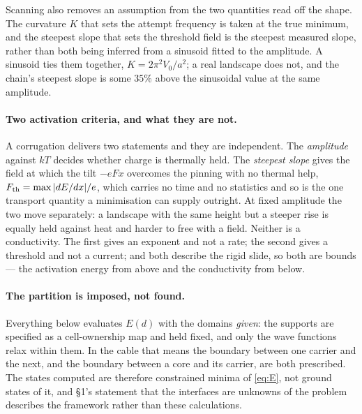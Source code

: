 \documentclass[11pt]{article}
\begin{document}
Scanning also removes an assumption from the two quantities read off the shape. The curvature $K$
that sets the attempt frequency is taken at the true minimum, and the steepest slope that sets the
threshold field is the steepest measured slope, rather than both being inferred from a sinusoid
fitted to the amplitude. A sinusoid ties them together, $K=2\pi^2V_0/a^2$; a real landscape does
not, and the chain's steepest slope is some $35\%$ above the sinusoidal value at the same
amplitude.

\paragraph{Two activation criteria, and what they are not.} A corrugation delivers two statements
and they are independent. The \emph{amplitude} against $kT$ decides whether charge is thermally
held. The \emph{steepest slope} gives the field at which the tilt $-eFx$ overcomes the pinning with
no thermal help, $F_{\rm th}=\max|dE/dx|/e$, which carries no time and no statistics and so is the
one transport quantity a minimisation can supply outright. At fixed amplitude the two move
separately: a landscape with the same height but a steeper rise is equally held against heat and
harder to free with a field. Neither is a conductivity. The first gives an exponent and not a rate;
the second gives a threshold and not a current; and both describe the rigid slide, so both are
bounds --- the activation energy from above and the conductivity from below.

\paragraph{The partition is imposed, not found.} Everything below evaluates $E(d)$ with the domains
\emph{given}: the supports are specified as a cell-ownership map and held fixed, and only the wave
functions relax within them. In the cable that means the boundary between one carrier and the next,
and the boundary between a core and its carrier, are both prescribed. The states computed are
therefore constrained minima of \eqref{eq:E}, not ground states of it, and \S1's statement that the
interfaces are unknowns of the problem describes the framework rather than these calculations.
\end{document}

